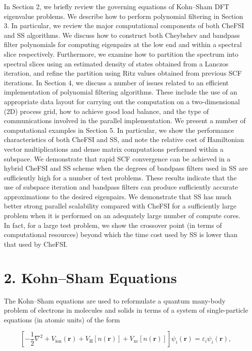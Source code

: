 \documentclass[
  10
]{article}
\begin{document}
In Section 2, we briefly review the governing equations of Kohn--Sham
DFT eigenvalue problems. We describe how to perform polynomial filtering
in Section 3. In particular, we review the major computational
components of both CheFSI and SS algorithms. We discuss how to construct
both Cheybshev and bandpass filter polynomials for computing eigenpairs
at the low end and within a spectral slice respectively. Furthermore, we
examine how to partition the spectrum into spectral slices using an
estimated density of states obtained from a Lanczos iteration, and
refine the partition using Ritz values obtained from previous SCF
iterations. In Section 4, we discuss a number of issues related to an
efficient implementation of polynomial filtering algorithms. These
include the use of an appropriate data layout for carrying out the
computation on a two-dimensional (2D) process grid, how to achieve good
load balance, and the type of communications involved in the parallel
implementation. We present a number of computational examples in Section
5. In particular, we show the performance characteristics of both CheFSI
and SS, and note the relative cost of Hamiltonian vector multiplications
and dense matrix computations performed within a subspace. We
demonstrate that rapid SCF convergence can be achieved in a hybrid
CheFSI and SS scheme when the degrees of bandpass filters used in SS are
sufficiently high for a number of test problems. These results indicate
that the use of subspace iteration and bandpass filters can produce
sufficiently accurate approximations to the desired eigenpairs. We
demonstrate that SS has much better strong parallel scalability compared
with CheFSI for a sufficiently large problem when it is performed on an
adequately large number of compute cores. In fact, for a large test
problem, we show the crossover point (in terms of computational
resources) beyond which the time cost used by SS is lower than that used
by CheFSI.

\section{2. Kohn--Sham Equations}\label{kohnsham-equations}

The Kohn--Sham equations are used to reformulate a quantum many-body
problem of electrons in molecules and solids in terms of a system of
single-particle equations (in atomic units) of the form

\[
\left[ - \frac {1}{2} \nabla^ {2} + V _ {\text {ion}} (\mathbf {r}) + V _ {\mathrm{H}} [ n (\mathbf {r}) ] + V _ {\mathrm{xc}} [ n (\mathbf {r}) ] \right] \psi_ {i} (\mathbf {r}) = \varepsilon_ {i} \psi_ {i} (\mathbf {r}), \tag {1}
\]
\end{document}

